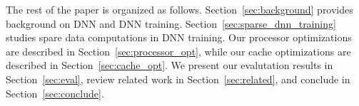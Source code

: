 The rest of the paper is organized as follows.  Section~\ref{sec:background} provides background on DNN and DNN training.  Section~\ref{sec:sparse_dnn_training} studies spare data computations in DNN training.  Our processor optimizations are described in Section~\ref{sec:processor_opt}, while our cache optimizations are described in Section~\ref{sec:cache_opt}.  We present our evalutation results in Section~\ref{sec:eval}, review related work in Section~\ref{sec:related},  and conclude in Section~\ref{sec:conclude}.


